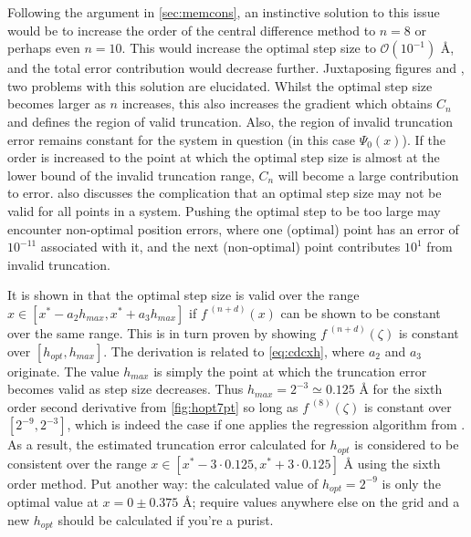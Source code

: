 Following the argument in \cref{sec:memcons}, an instinctive solution to this issue would be to increase the order of the central difference method to $n=8$ or perhaps even $n=10$.
This would increase the optimal step size to $\mathcal{O}(10^{-1})$ \AA, and the total error contribution would decrease further.
Juxtaposing figures  and , two problems with this solution are elucidated.
Whilst the optimal step size becomes larger as $n$ increases, this also increases the gradient which obtains $C_n$ and defines the region of valid truncation.
Also, the region of invalid truncation error remains constant for the system in question (in this case $\Psi_0(x)$).
If the order is increased to the point at which the optimal step size is almost at the lower bound of the invalid truncation range, $C_n$ will become a large contribution to error.
 also discusses the complication that an optimal step size may not be valid for all points in a system.
Pushing the optimal step to be too large may encounter non-optimal position errors, where one (optimal) point has an error of $10^{-11}$ associated with it, and the next (non-optimal) point contributes $10^1$ from invalid truncation.

It is shown in \citeauthor{Mathur2012} that the optimal step size is valid over the range $x \in [x^*-a_2h_{max},x^*+a_3h_{max}]$ if $f^{\;(n+d)}(x)$ can be shown to be constant over the same range.
This is in turn proven by showing $f^{\;(n+d)}(\zeta)$ is constant over $[h_{opt},h_{max}]$.
The derivation is related to \cref{eq:cdcxh}, where $a_2$ and $a_3$ originate.
The value $h_{max}$ is simply the point at which the truncation error becomes valid as step size decreases.
Thus $h_{max} = 2^{-3} \simeq 0.125$ Å for the sixth order second derivative from \cref{fig:hopt7pt} so long as $f^{\;(8)}(\zeta)$ is constant over $[2^{-9},2^{-3}]$, which is indeed the case if one applies the regression algorithm from .
As a result, the estimated truncation error calculated for $h_{opt}$ is considered to be consistent over the range $x \in [x^*-3\cdot0.125,x^*+3\cdot0.125]$ Å using the sixth order method.
Put another way: the calculated value of $h_{opt} = 2^{-9}$ is only the optimal value at $x=0\pm0.375$ Å; require values anywhere else on the grid and a new $h_{opt}$ should be calculated if you're a purist.

